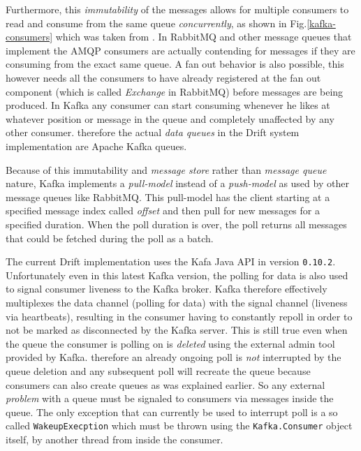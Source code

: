 Furthermore, this \textit{immutability} of the messages allows
for multiple consumers to read and consume from the same queue
\textit{concurrently}, as shown in Fig.\ref{kafka-consumers} which
was taken from \cite{kafka}.
In RabbitMQ and other message queues that
implement the AMQP consumers are actually contending for messages
if they are consuming from the exact same queue. A fan out behavior
is also possible, this however needs all the consumers to have already
registered at the fan out component (which is called \textit{Exchange}
in RabbitMQ) before messages are being produced.
In Kafka any consumer can start consuming whenever he likes at
whatever position or message in the queue and completely unaffected
by any other consumer. therefore the actual \textit{data queues}
in the Drift system implementation are Apache Kafka queues.

Because of this immutability and \textit{message store} rather
than \textit{message queue} nature, Kafka implements a \textit{pull-model}
instead of a \textit{push-model} as used by other message queues
like RabbitMQ. This pull-model has the client starting at a
specified message index called \textit{offset} and then pull
for new messages for a specified duration. When the poll
duration is over, the poll returns all messages that could be
fetched during the poll as a batch.

The current Drift implementation uses the Kafa Java API in
version \texttt{0.10.2}.
Unfortunately even in this latest Kafka version, the polling for data is
also used to signal consumer liveness to the Kafka broker.
Kafka therefore effectively multiplexes the data channel (polling for data)
with the signal channel (liveness via heartbeats), resulting
in the consumer having to constantly repoll in order to not
be marked as disconnected by the Kafka server.
This is still true even when the queue the consumer is polling
on is \textit{deleted} using the external admin tool provided
by Kafka. therefore an already ongoing poll is \textit{not}
interrupted by the queue deletion and any subsequent poll will
recreate the queue because consumers can also create queues
as was explained earlier. So any external \textit{problem}
with a queue must be signaled to consumers via messages inside
the queue. The only exception that can currently be used to
interrupt poll is a so called \texttt{WakeupExecption} which
must be thrown using the \texttt{Kafka.Consumer} object itself,
by another thread from inside the consumer.
\newline

